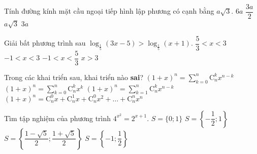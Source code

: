 \begin{ex}%
	Tính đường kính mặt cầu ngoại tiếp hình lập phương có cạnh bằng $a\sqrt3$. 
	\choice
	{$6a$}
	{$\dfrac{3a}{2}$}
	{$a \sqrt3$}
	{\True $3a$}
\end{ex}

\begin{ex}%
	Giải bất phương trình sau $\log_{\frac{1}{5}}(3x-5)>\log_{\frac{1}{5}}(x+1)$.
	\choice
	{\True $\dfrac{5}{3}<x<3$}
	{$-1<x<3$}
	{$-1<x<\dfrac{5}{3}$}
	{$x>3$}
\end{ex}

\begin{ex}%
	Trong các khai triển sau, khai triển nào \textbf{sai}?
	\choice
	{$(1+x)^n=\displaystyle\sum\limits_{k=0}^n \mathrm{C}_n^kx^{n-k}$}
	{$(1+x)^n=\displaystyle\sum\limits_{k=0}^n \mathrm{C}_n^k x^k$}
	{\True $(1+x)^n=\displaystyle\sum\limits_{k=1}^n \mathrm{C}_n^k x^{n-k}$}
	{$(1+x)^n=\displaystyle\mathrm{C}_n^0 x+\mathrm{C}_n^1 x+\mathrm{C}_n^0 x^2+\ldots+\mathrm{C}_n^n x^n$}
\end{ex}

\begin{ex}%
	Tìm tập nghiệm của phương trình $4^{x^2}=2^{x+1}$.
	\choice
	{$S=\{0;1\}$}
	{\True $S=\left\{-\dfrac{1}{2};1\right\}$}
	{$S=\left\{\dfrac{1-\sqrt5}{2};\dfrac{1+\sqrt5}{2}\right\}$}
	{$S=\left\{-1;\dfrac{1}{2}\right\}$}
\end{ex}

